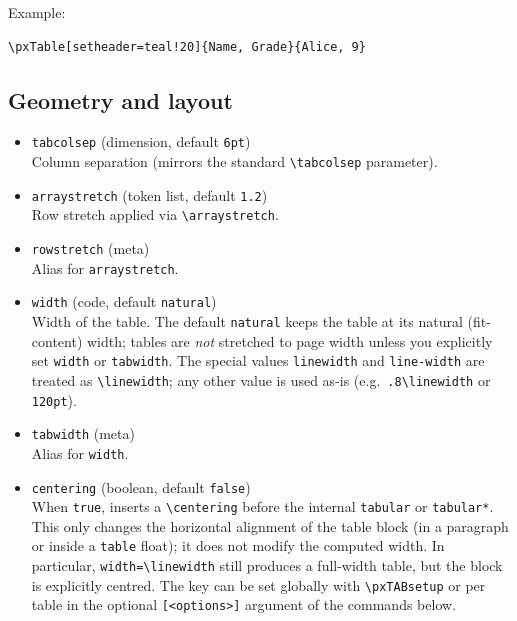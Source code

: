 \documentclass[11pt,a4paper]{article}
\begin{document}
\noindent Example:

\begin{verbatim}
\pxTable[setheader=teal!20]{Name, Grade}{Alice, 9}
\end{verbatim}

\subsection*{Geometry and layout}

\begin{itemize}
  \item \texttt{tabcolsep} (dimension, default \texttt{6pt})\\
    Column separation (mirrors the standard \verb|\tabcolsep| parameter).

  \item \texttt{arraystretch} (token list, default \texttt{1.2})\\
    Row stretch applied via \verb|\arraystretch|.

  \item \texttt{rowstretch} (meta)\\
    Alias for \texttt{arraystretch}.

  \item \texttt{width} (code, default \texttt{natural})\\
    Width of the table.  The default \texttt{natural} keeps the table
    at its natural (fit-content) width; tables are \emph{not} stretched
    to page width unless you explicitly set \texttt{width} or
    \texttt{tabwidth}.  The special values \texttt{linewidth} and
    \texttt{line-width} are treated as \verb|\linewidth|; any other
    value is used as-is (e.g.\ \verb|.8\linewidth| or \verb|120pt|).

  \item \texttt{tabwidth} (meta)\\
    Alias for \texttt{width}.

  \item \texttt{centering} (boolean, default \texttt{false})\\
    When \texttt{true}, inserts a \verb|\centering| before the internal
    \texttt{tabular} or \texttt{tabular*}.  This only changes the
    horizontal alignment of the table block (in a paragraph or inside a
    \texttt{table} float); it does not modify the computed width.  In
    particular, \verb|width=\linewidth| still produces a full-width
    table, but the block is explicitly centred.  The key can be set
    globally with \verb|\pxTABsetup| or per table in the optional
    \verb|[<options>]| argument of the commands below.


\end{itemize}
\end{document}
